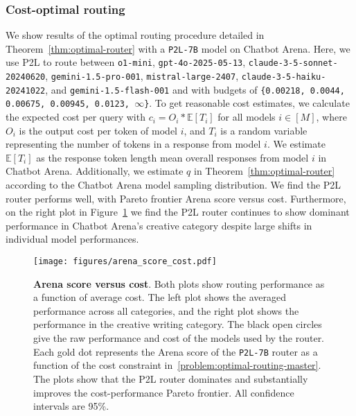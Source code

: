 \subsubsection{Cost-optimal routing}
\label{sec:cost_routing}
We show results of the optimal routing procedure detailed in Theorem~\ref{thm:optimal-router} with a \texttt{P2L-7B} model on Chatbot Arena.
Here, we use P2L to route between \texttt{o1-mini}, \texttt{gpt-4o-2025-05-13}, \texttt{claude-3-5-sonnet-20240620}, \texttt{gemini-1.5-pro-001}, \texttt{mistral-large-2407}, \texttt{claude-3-5-haiku-20241022}, and \texttt{gemini-1.5-flash-001} and with budgets of \texttt{\{0.00218, 0.0044, 0.00675, 0.00945, 0.0123, $\infty$\}}. To get reasonable cost estimates, we calculate the expected cost per query with $c_i = O_i*\mathbb{E}[T_i]$ for all models $i\in[M]$, where $O_i$ is the output cost per token of model $i$, and $T_i$ is a random variable representing the number of tokens in a response from model $i$. We estimate $\mathbb{E}[T_i]$ as the response token length mean overall responses from model $i$ in Chatbot Arena. Additionally, we estimate $q$ in Theorem~\ref{thm:optimal-router} according to the Chatbot Arena model sampling distribution. We find the P2L router performs well, with Pareto frontier Arena score versus cost. Furthermore, on the right plot in Figure~\ref{fig:routing-metrics} we find the P2L router continues to show dominant performance in Chatbot Arena's creative category despite large shifts in individual model performances.

\begin{figure}[t]
    \centering
    \texttt{[image: figures/arena\_score\_cost.pdf]}
    \caption{\textbf{Arena score versus cost}. Both plots show routing performance as a function of average cost. The left plot shows the averaged performance across all categories, and the right plot shows the performance in the creative writing category. The black open circles give the raw performance and cost of the models used by the router. Each gold dot represents the Arena score of the  \texttt{P2L-7B} router as a function of the cost constraint in~\eqref{problem:optimal-routing-master}. The plots show that the P2L router dominates and substantially improves the cost-performance Pareto frontier. All confidence intervals are 95\%.}
    \label{fig:routing-metrics}
\end{figure}






